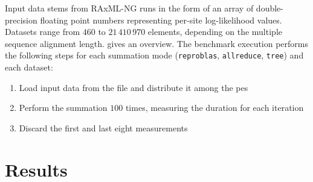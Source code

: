 Input data stems from RAxML-NG runs in the form of an array of double-precision floating point numbers representing per-site log-likelihood values.
Datasets range from $460$ to $21\,410\,970$ elements, depending on the multiple sequence alignment length.
 gives an overview.
The benchmark execution performs the following steps for each summation mode (\texttt{reproblas}, \texttt{allreduce}, \texttt{tree}) and each dataset:
\begin{enumerate}
\item Load input data from the file and distribute it among the \glspl{pe}
\item Perform the summation $100$ times, measuring the duration for each iteration
\item Discard the first and last eight measurements
\end{enumerate}

\section{Results}
\label{sec:Results}

